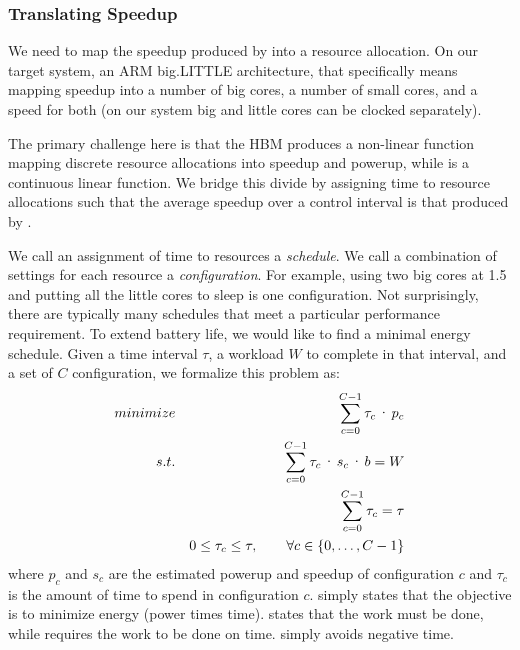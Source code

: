 \subsubsection{Translating Speedup}
We need to map the speedup produced by  into a
resource allocation.  On our target system, an ARM big.LITTLE
architecture, that specifically means mapping speedup into a number of
big cores, a number of small cores, and a speed for both (on our
system big and little cores can be clocked separately).

The primary challenge here is that the HBM produces a non-linear
function mapping discrete resource allocations into speedup and
powerup, while  is a continuous linear
function.  We bridge this divide by assigning time to resource
allocations such that the average speedup over a control interval is
that produced by .

We call an assignment of time to resources a \emph{schedule}. We call
a combination of settings for each resource a \emph{configuration}.  For
example, using two big cores at 1.5 \GHz and putting all the little
cores to sleep is one configuration.  Not surprisingly, there are
typically many schedules that meet a particular performance
requirement.  To extend battery life, we would like to find a minimal
energy schedule. Given a time interval $\tau$, a workload $W$ to
complete in that interval, and a set of $C$ configuration, we
formalize this problem as:
\begin{eqnarray}
  \minimize && \sum_{c=0}^{C-1} \tau_c \cdot p_c \label{eqn:power} \\
  \st %
  && \sum_{c=0}^{C-1} \tau_c \cdot s_c \cdot b =  W \label{eqn:work} \\
  && \sum_{c=0}^{C-1} \tau_c =  \tau \label{eqn:deadline} \\
  && 0 \le \tau_c \le \tau, \qquad \forall c \in \{0,\ldots,C-1\} \label{eqn:time}
\end{eqnarray}
where $p_c$ and $s_c$ are the estimated powerup and speedup of
configuration $c$ and $\tau_c$ is the amount of time to spend in
configuration $c$.   simply states that the objective is
to minimize energy (power times time).   states that the
work must be done, while  requires the work to be
done on time.   simply avoids negative time.  


